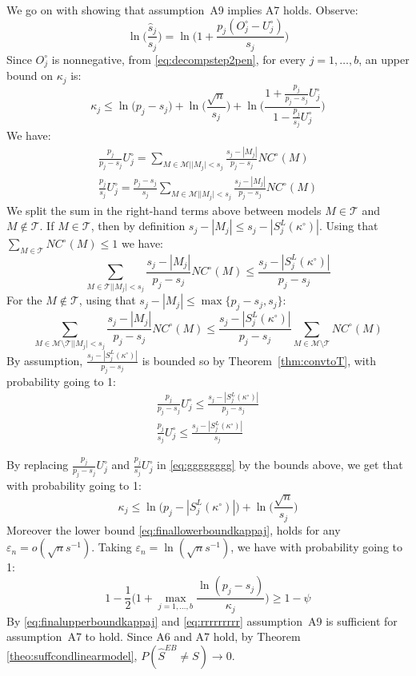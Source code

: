 \documentclass[aos]{imsart}
\theoremstyle{plain}
\begin{document}
\begin{supplement}
We go on with showing that assumption~A9 implies A7 holds. Observe:
$$\ln\Big(\frac{\widehat{s}_j}{s_j}\Big)=\ln\Big(1+\frac{p_j(O^{\circ}_j-U^{\circ}_j)}{s_j}\Big) $$
Since $O_j^{\circ}$ is nonnegative, from \eqref{eq:decompstep2pen}, for every $j=1,\ldots,b$, an upper bound on $\kappa_j$ is:
\begin{equation}\label{eq:gggggggg}
    \kappa_j \leq \ln\big(p_j-s_j\big)+\ln\Big(\frac{\sqrt{n}}{s_j}\Big)+\ln\bigg(\frac{1+\frac{p_j}{p_j-s_j}U^{\circ}_j}{1-\frac{p_j}{s_j}U^{\circ}_j}\bigg)
\end{equation}
We have:
\begin{align*}
    \frac{p_j}{p_j-s_j}U^{\circ}_j = \sum_{M \in \mathcal{M} | |M_j| < s_j}\frac{s_j-|M_j|}{p_j-s_j}NC^{\circ}(M) \\
    \frac{p_j}{s_j}U^{\circ}_j = \frac{p_j-s_j}{s_j} \sum_{M \in \mathcal{M} | |M_j| < s_j}\frac{s_j-|M_j|}{p_j-s_j}NC^{\circ}(M)
\end{align*}
We split the sum in the right-hand terms above between models $M\in \mathcal{T}$ and $M\not\in \mathcal{T}$. If $M\in \mathcal{T}$, then by definition $s_j-|M_j|\leq s_j-|S^L_j(\kappa^{\circ})|$. Using that $ \sum_{M \in \mathcal{T}}NC^{\circ}(M)\leq 1$ we have: 
$$ \sum_{M \in \mathcal{T} | |M_j| < s_j}\frac{s_j-|M_j|}{p_j-s_j}NC^{\circ}(M) \leq \frac{s_j-|S^L_j(\kappa^{\circ})|}{p_j-s_j}$$
For the $M\not\in \mathcal{T}$, using that $s_j-|M_j|\leq\max\{p_j-s_j,s_j\}$:
$$\sum_{M \in \mathcal{M}\setminus \mathcal{T} | |M_j| < s_j}\frac{s_j-|M_j|}{p_j-s_j}NC^{\circ}(M) \leq \frac{s_j-|S^L_j(\kappa^{\circ})|}{p_j-s_j}\sum_{M \in \mathcal{M}\setminus \mathcal{T} }NC^{\circ}(M)$$
By assumption, $\frac{s_j-|S^L_j(\kappa^{\circ})|}{p_j-s_j}$ is bounded so by Theorem~\ref{thm:convtoT}, with probability going to 1:
\begin{align*}
    \frac{p_j}{p_j-s_j}U^{\circ}_j \leq \frac{s_j-|S^L_j(\kappa^{\circ})|}{p_j-s_j}\\
    \frac{p_j}{s_j}U^{\circ}_j \leq  \frac{s_j-|S^L_j(\kappa^{\circ})|}{s_j}
\end{align*}

By replacing $\frac{p_j}{p_j-s_j}U^{\circ}_j$ and $\frac{p_j}{s_j}U^{\circ}_j$ in \eqref{eq:gggggggg} by the bounds above, we get that  with probability going to 1:
\begin{equation}\label{eq:finalupperboundkappaj}
  \kappa_j \leq \ln\big(p_j-|S^L_j(\kappa^{\circ})|\big)+\ln\Big(\frac{\sqrt{n}}{s_j}\Big)
\end{equation}
Moreover the lower bound \eqref{eq:finallowerboundkappaj}, holds for any $\varepsilon_n=o(\sqrt{n}s^{-1})$. Taking $\varepsilon_n=\ln(\sqrt{n}s^{-1})$, we have with probability going to 1:
\begin{equation}\label{eq:rrrrrrrrr}
    1-\frac12\Big(1+\max_{j=1, \ldots,b}\frac{\ln(p_j-s_j)}{\kappa_j}\Big) \geq 1-\psi
\end{equation}
By \eqref{eq:finalupperboundkappaj} and \eqref{eq:rrrrrrrrr} assumption~A9 is sufficient for assumption~A7 to hold. Since A6 and A7 hold, by Theorem \ref{theo:suffcondlinearmodel}, $P(\hat{S}^{EB}\neq S) \to 0$.


\end{supplement}
\end{document}
